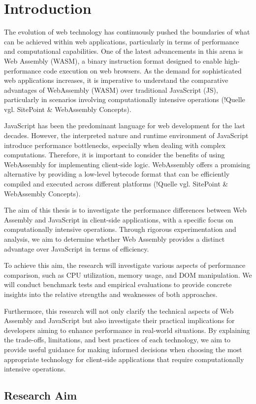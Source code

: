 \newpage

\section{Introduction} \label{introduction}
The evolution of web technology has continuously pushed the boundaries of what can be achieved within web applications, particularly in terms of performance and computational capabilities. One of the latest advancements in this arena is Web Assembly (WASM), a binary instruction format designed to enable high-performance code execution on web browsers. As the demand for sophisticated web applications increases, it is imperative to understand the comparative advantages of WebAssembly (WASM) over traditional JavaScript (JS), particularly in scenarios involving computationally intensive operations (!Quelle vgl. SitePoint & WebAssembly Concepts).

JavaScript has been the predominant language for web development for the last decades. However, the interpreted nature and runtime environment of JavaScript introduce performance bottlenecks, especially when dealing with complex computations. Therefore, it is important to consider the benefits of using WebAssembly for implementing client-side logic. WebAssembly offers a promising alternative by providing a low-level bytecode format that can be efficiently compiled and executed across different platforms (!Quelle vgl. SitePoint &  WebAssembly Concepts).

The aim of this thesis is to investigate the performance differences between Web Assembly and JavaScript in client-side applications, with a specific focus on computationally intensive operations. Through rigorous experimentation and analysis, we aim to determine whether Web Assembly provides a distinct advantage over JavaScript in terms of efficiency.

To achieve this aim, the research will investigate various aspects of performance comparison, such as CPU utilization, memory usage, and DOM manipulation. We will conduct benchmark tests and empirical evaluations to provide concrete insights into the relative strengths and weaknesses of both approaches.

Furthermore, this research will not only clarify the technical aspects of Web Assembly and JavaScript but also investigate their practical implications for developers aiming to enhance performance in real-world situations. By explaining the trade-offs, limitations, and best practices of each technology, we aim to provide useful guidance for making informed decisions when choosing the most appropriate technology for client-side applications that require computationally intensive operations.

\subsection{Research Aim} \label{aim}

 \label{objectives}

